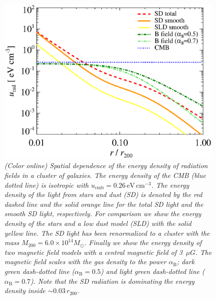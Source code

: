 \documentclass[10pt,aps,pra,reprint,amsmath,amsfonts,amssymb,showpacs,nofootinbib,floatfix]{revtex4-1}
\newcommand{\rmn}{\mathrm}
\newcommand{\msun}{M_\odot}
\newcommand{\rvir}{r_{200}}
\newcommand{\mvir}{M_{200}}
\begin{document}
\begin{figure}%
 \includegraphics[width=0.99\columnwidth]{figures/ucool.bw.eps}
 \caption{\it (Color online) Spatial dependence of the energy density
   of radiation fields in a cluster of galaxies. The energy density of
   the CMB (blue dotted line) is isotropic with
   $u_\rmn{cmb}=0.26\,\rmn{eV}\,\rmn{cm}^{-3}$. The energy density of
   the light from stars and dust (SD) is denoted by the red dashed
   line and the solid orange line for the total SD light and the
   smooth SD light, respectively. For comparison we show the energy
   density of the stars and a low dust model (SLD) with the solid
   yellow line. The SD light has been renormalized to a cluster with
   the mass $\mvir=6.0\times10^{14}\msun$. Finally we show the energy
   density of two magnetic field models with a central magnetic field
   of 3~$\mu G$. The magnetic field scales with the gas density to the
   power $\alpha_\rmn{B}$; dark green dash-dotted line
   ($\alpha_\rmn{B}=0.5$) and light green dash-dotted line
   ($\alpha_\rmn{B}=0.7$). Note that the SD radiation is dominating
   the energy density inside $\sim0.03\,\rvir$.}
 \label{fig:SD_Edens}
\end{figure}
\end{document}

